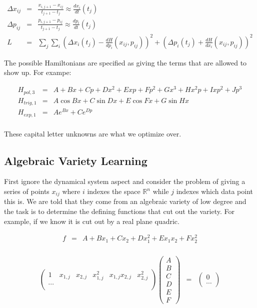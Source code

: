 \documentclass[a4paper,landscape]{article}
\theoremstyle{change}
\theoremstyle{nonumberplain}
\numberwithin{equation}{section}
\begin{document}
\begin{eqnarray*}
\Delta x_{ij} &=& \frac{x_{i,j+1} - x_{ij}}{t_{j+1} - t_j} \approx \frac{dx_i}{dt} (t_j)\\
\Delta p_{ij} &=& \frac{p_{i,j+1} - p_{ij}}{t_{j+1} - t_j} \approx \frac{dp_i}{dt} (t_j)\\
L &=& \sum_j \sum_i (\Delta x_i (t_j)  - \frac{dH}{dp_i} (x_{ij} , p_{ij} ))^2 + (\Delta p_i (t_j)  + \frac{dH}{dx_i} (x_{ij} , p_{ij} ))^2
\end{eqnarray*}

The possible Hamiltonians are specified as giving the terms that are allowed to show up. For exampe:

\begin{eqnarray*}
H_{pol,3} &=& A + Bx + Cp + Dx^2 + E xp + Fp^2 + G x^3 + H x^2 p + I xp^2 + J p^3\\
H_{trig,1} &=& A \cos B x + C \sin D x + E \cos F x + G \sin H x\\
H_{exp,1} &=& A e^{Bx} + C e^{Dp}\\
\end{eqnarray*}

These capital letter unknowns are what we optimize over.

\subsection{Algebraic Variety Learning}

First ignore the dynamical system aspect and consider the problem of giving a series of points $x_{ij}$ where $i$ indexes the space $\mathbb{R}^n$ while $j$ indexes which data point this is. We are told that they come from an algebraic variety of low degree and the task is to determine the defining functions that cut out the variety. For example, if we know it is cut out by a real plane quadric.

\begin{eqnarray*}
f &=& A + B x_1 + C x_2 + D x_1^2 + E x_1 x_2 + F x_2^2\\
\end{eqnarray*}

\begin{eqnarray*}
\begin{pmatrix}
1 & x_{1,j} & x_{2,j} & x_{1,j}^2 & x_{1,j} x_{2,j} & x_{2,j}^2\\
\cdots\\
\end{pmatrix}
\begin{pmatrix}
A\\
B\\
C\\
D\\
E\\
F
\end{pmatrix}
&=&
\begin{pmatrix}
0\\
\cdots
\end{pmatrix}
\end{eqnarray*}
\end{document}
